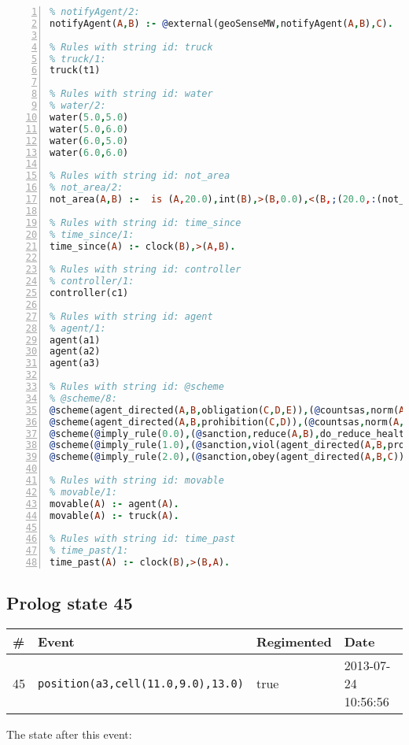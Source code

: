 \documentclass[11pt]{article}\usepackage[utf8]{inputenc}\usepackage{geometry}
\begin{document}
\begin{lstlisting}[language=Prolog, numbers=left]
% Rules with string id: notifyAgent
% notifyAgent/2:
notifyAgent(A,B) :- @external(geoSenseMW,notifyAgent(A,B),C).

% Rules with string id: truck
% truck/1:
truck(t1)

% Rules with string id: water
% water/2:
water(5.0,5.0)
water(5.0,6.0)
water(6.0,5.0)
water(6.0,6.0)

% Rules with string id: not_area
% not_area/2:
not_area(A,B) :-  is (A,20.0),int(B),>(B,0.0),<(B,;(20.0,:(not_area(A,B), is (-(B),20.0)))),int(A),>(A,0.0),<(A,;(20.0,:(area(A,B),-(int(A))))),int(B),>(A,0.0),>(B,0.0),<(A,21.0),<(B,21.0).

% Rules with string id: time_since
% time_since/1:
time_since(A) :- clock(B),>(A,B).

% Rules with string id: controller
% controller/1:
controller(c1)

% Rules with string id: agent
% agent/1:
agent(a1)
agent(a2)
agent(a3)

% Rules with string id: @scheme
% @scheme/8:
@scheme(agent_directed(A,B,obligation(C,D,E)),(@countsas,norm(A,B,F,obligation(C,D,E)),F),false,(listTrue(C)),(time_past(D)),false,[plus(viol(agent_directed(A,B,obligation(C,D,E))))|[]],[plus(obey(agent_directed(A,B,obligation(C,D,E))))|[]])
@scheme(agent_directed(A,B,prohibition(C,D)),(@countsas,norm(A,B,E,prohibition(C,D)),E),(listTrue(C)),false,(false),false,[plus(viol(agent_directed(A,B,prohibition(C,D))))|[]],[plus(obey(agent_directed(A,B,prohibition(C,D))))|[]])
@scheme(@imply_rule(0.0),(@sanction,reduce(A,B),do_reduce_health(A,B),notifyAgent(A,changed(status))),true,false,false,false,[min(reduce(A,B))|[]],[])
@scheme(@imply_rule(1.0),(@sanction,viol(agent_directed(A,B,prohibition(C,D))),do_sanction(D)),true,false,false,false,[min(viol(agent_directed(A,B,prohibition(C,D))))|[]],[])
@scheme(@imply_rule(2.0),(@sanction,obey(agent_directed(A,B,C))),true,false,false,false,[min(obey(agent_directed(A,B,C)))|[]],[])

% Rules with string id: movable
% movable/1:
movable(A) :- agent(A).
movable(A) :- truck(A).

% Rules with string id: time_past
% time_past/1:
time_past(A) :- clock(B),>(B,A).

\end{lstlisting}
\clearpage 
\subsection{Prolog state 45}
\begin{table}[ht]
\centering 
\begin{tabular}{l l l l} 
\textbf{\#} & \textbf{Event} & \textbf{Regimented} & \textbf{Date} \\ [0.5ex] 
\hline
45&\texttt{position(a3,cell(11.0,9.0),13.0)}&true&2013-07-24 10:56:56\\ [1ex] \hline\end{tabular}
\end{table}
The state after this event:
\end{document}
